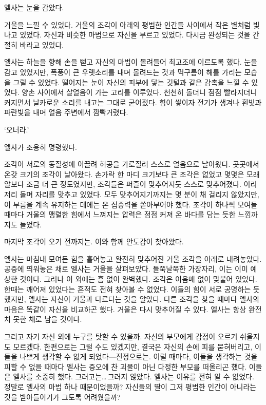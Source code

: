 엘사는 눈을 감았다.

거울을 느낄 수 있었다. 거울의 조각이 아래의 평범한 인간들 사이에서 작은 별처럼 빛나고 있었다. 자신과 비슷한 마법으로 자신을 부르고 있었다. 다시금 완성되는 것을 간절히 바라고 있었다.

엘사는 하늘을 향해 손을 뻗고 자신의 마법이 몰려들어 최고조에 이르도록 했다. 눈을 감고 있었지만, 폭풍이 큰 우렛소리를 내며 몰려드는 것과 먹구름이 해를 가리는 모습을 그릴 수 있었다. 떨어지는 눈이 자신의 피부에 닿는 깃털과 같은 감촉을 느낄 수 있었다. 양손 사이에서 살얼음이 가는 고리를 이루었다. 천천히 돌더니 점점 빨라지더니 커지면서 날카로운 소리를 내고는 그대로 굳어졌다. 힘이 쌓이자 전기가 생겨나 흰빛과 파란빛을 내며 얼음 주변에서 깜빡거렸다. 

`오너라.' 

엘사가 조용히 명령했다.

조각이 서로의 동질성에 이끌려 허공을 가로질러 스스로 얼음으로 날아왔다. 곳곳에서 온갖 크기의 조각이 날아왔다. 손가락 한 마디 크기보다 큰 조각은 없었고 몇몇은 모래알보다 조금 더 큰 정도였지만, 조각들은 퍼즐이 맞추어지듯 스스로 맞추어졌다. 이리저리 돌며 자리를 맞추고 있었다. 모두 맞추어지기까지는 몇 분이 채 걸리지 않았지만, 이 부름을 계속 유지하는 데에는 온 집중력을 쏟아부어야 했다. 조각이 하나씩 모여들 때마다 거울의 맹렬한 힘에서 느껴지는 압력은 점점 커져 온 바다를 담는 듯한 느낌까지도 들었다.

마지막 조각이 오기 전까지는. 이와 함께 안도감이 찾아왔다.

엘사는 마침내 모여든 힘을 흩어놓고 완전히 맞추어진 거울 조각을 아래로 내려놓았다. 공중에 띄워놓은 채로 엘사는 거울을 살펴보았다. 들쭉날쭉한 가장자리, 이는 이미 예상한 것이다. 그러나 이 외에는 흠 없이 완벽했다. 조각은 이음매 없이 맞붙어 있었다. 한때는 깨어져 있었다는 흔적도 전혀 찾아볼 수 없었다. 이들의 힘이 서로 공명하는 듯했지만, 엘사는 자신이 거울과 다르다는 것을 알았다. 다른 조각을 찾을 때마다 엘사의 마음은 똑같이 자신을 비교하곤 했다. 거울은 다시 맞추어질 수 있다. 엘사는 항상 완전치 못한 채로 남을 것이다.

그리고 자기 자신 외에 누구를 탓할 수 있을까. 자신의 부모에게 감정이 오르기 쉬울지도 모르겠다. 한편으로는 그럴 수도 있겠지만, 결국은 자신의 손에 피를 묻혀버리고, 이들을 나쁘게 생각할 수 없게 되었다—진정으로는. 이럴 때마다, 이들을 생각하는 것을 피할 수 없을 때마다 엘사는 증오에 찬 괴물이 아닌 다정한 부모를 떠올리곤 했다. 이들은 엘사를 소중히 했다. 그러고는\ldots\,그러지 않았다. 엘사는 이유를 전혀 알 수 없었다. 정말로 엘사의 마법 하나 때문이었을까? 자신들의 딸이 그저 평범한 인간이 아니라는 것을 받아들이기가 그토록 어려웠을까?

